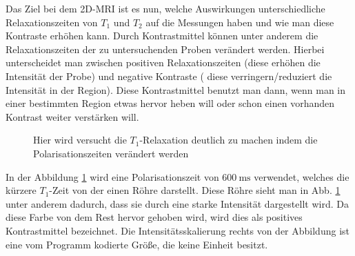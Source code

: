 Das Ziel bei dem 2D-MRI ist es nun, welche Auswirkungen unterschiedliche Relaxationszeiten von $T_1$ und $T_2$ auf die Messungen haben und wie man diese Kontraste erhöhen kann. Durch Kontrastmittel können unter anderem die Relaxationszeiten der zu untersuchenden Proben verändert werden. Hierbei unterscheidet man zwischen positiven Relaxationszeiten (diese erhöhen die Intensität der Probe) und negative Kontraste ( diese verringern/reduziert die Intensität in der Region).  Diese Kontrastmittel benutzt man dann, wenn man in einer bestimmten Region etwas hervor heben will oder schon einen vorhanden Kontrast weiter verstärken will.   
\begin{figure}[H]
\centering
{}
{}
{}
{}
\caption{Hier wird versucht die $T_1$-Relaxation deutlich zu machen indem die Polarisationszeiten verändert werden}\label{fig:11600}
\end{figure}
In der Abbildung \ref{fig:11600} wird eine Polarisationszeit von $\SI{600}{\milli\second}$ verwendet,
 welches die kürzere $T_1$-Zeit von der einen Röhre darstellt. Diese Röhre sieht man in Abb. \ref{fig:11600} unter anderem dadurch,
dass sie durch eine starke Intensität dargestellt wird. Da diese Farbe von dem Rest hervor gehoben wird, wird dies als positives Kontrastmittel bezeichnet.
Die Intensitätsskalierung rechts von der Abbildung ist eine vom Programm kodierte Größe, die keine Einheit besitzt.\\

